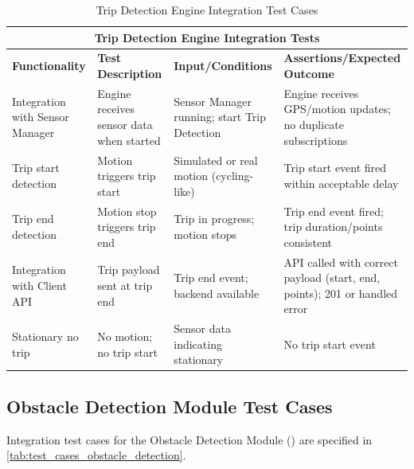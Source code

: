 \begin{table}[ht]
\centering
\begin{tabular}{|p{3.2cm}|p{3.8cm}|p{3.2cm}|p{4.8cm}|}
\hline
\multicolumn{4}{|c|}{\textbf{Trip Detection Engine Integration Tests}} \\ 
\hline
\textbf{Functionality} & \textbf{Test Description} & \textbf{Input/Conditions} & \textbf{Assertions/Expected Outcome} \\
\hline
Integration with Sensor Manager
 & Engine receives sensor data when started
 & Sensor Manager running; start Trip Detection
 & Engine receives GPS/motion updates; no duplicate subscriptions \\ \hline
Trip start detection
 & Motion triggers trip start
 & Simulated or real motion (cycling-like)
 & Trip start event fired within acceptable delay \\ \hline
Trip end detection
 & Motion stop triggers trip end
 & Trip in progress; motion stops
 & Trip end event fired; trip duration/points consistent \\ \hline
Integration with Client API
 & Trip payload sent at trip end
 & Trip end event; backend available
 & API called with correct payload (start, end, points); 201 or handled error \\ \hline
Stationary no trip
 & No motion; no trip start
 & Sensor data indicating stationary
 & No trip start event \\ \hline
\end{tabular}
\caption{Trip Detection Engine Integration Test Cases}
\label{tab:test_cases_trip_detection}
\end{table}

\subsection{Obstacle Detection Module Test Cases}
\label{subsec:obstacle_detection_module_test_cases}%

Integration test cases for the Obstacle Detection Module () are specified in \cref{tab:test_cases_obstacle_detection}.

